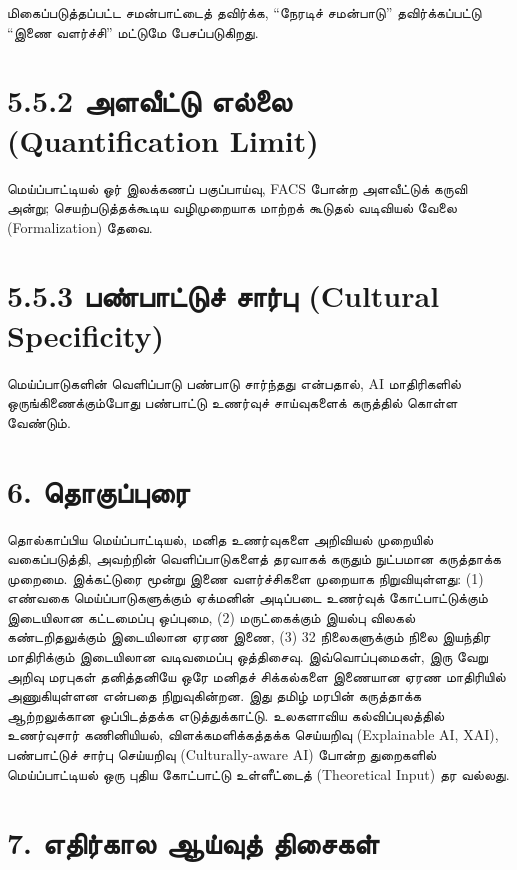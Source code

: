\documentclass[journal,10pt,twocolumn]{IEEEtran}
\begin{document}
மிகைப்படுத்தப்பட்ட சமன்பாட்டைத் தவிர்க்க,
“நேரடிச் சமன்பாடு” தவிர்க்கப்பட்டு “இணை
வளர்ச்சி” மட்டுமே பேசப்படுகிறது.

\section{5.5.2 அளவீட்டு எல்லை (Quantification
Limit)}\label{uxb85uxbb3uxbb5uxb9fuxb9f-uxb8euxbb2uxbb2-quantification-limit}

மெய்ப்பாட்டியல் ஓர் இலக்கணப் பகுப்பாய்வு, FACS போன்ற அளவீட்டுக் கருவி அன்று;
செயற்படுத்தக்கூடிய வழிமுறையாக மாற்றக் கூடுதல் வடிவியல் வேலை (Formalization)
தேவை.

\section{5.5.3 பண்பாட்டுச் சார்பு (Cultural
Specificity)}\label{uxbaauxba3uxbaauxb9fuxb9fuxb9a-uxb9auxbb0uxbaa-cultural-specificity}

மெய்ப்பாடுகளின் வெளிப்பாடு பண்பாடு சார்ந்தது என்பதால், AI மாதிரிகளில்
ஒருங்கிணைக்கும்போது பண்பாட்டு உணர்வுச் சாய்வுகளைக் கருத்தில் கொள்ள வேண்டும்.

\section{6. தொகுப்புரை}\label{uxba4uxb95uxbaauxbaauxbb0}

தொல்காப்பிய மெய்ப்பாட்டியல், மனித உணர்வுகளை அறிவியல் முறையில் வகைப்படுத்தி, அவற்றின்
வெளிப்பாடுகளைத் தரவாகக் கருதும் நுட்பமான கருத்தாக்க முறைமை. இக்கட்டுரை மூன்று இணை
வளர்ச்சிகளை முறையாக நிறுவியுள்ளது: (1) எண்வகை மெய்ப்பாடுகளுக்கும் ஏக்மனின் அடிப்படை
உணர்வுக் கோட்பாட்டுக்கும் இடையிலான கட்டமைப்பு ஒப்புமை, (2) மருட்கைக்கும் இயல்பு விலகல்
கண்டறிதலுக்கும் இடையிலான ஏரண இணை, (3) 32 நிலைகளுக்கும் நிலை இயந்திர மாதிரிக்கும்
இடையிலான வடிவமைப்பு ஒத்திசைவு. இவ்வொப்புமைகள், இரு வேறு அறிவு மரபுகள்
தனித்தனியே ஒரே மனிதச் சிக்கல்களை இணையான ஏரண மாதிரியில் அணுகியுள்ளன என்பதை
நிறுவுகின்றன. இது தமிழ் மரபின் கருத்தாக்க ஆற்றலுக்கான ஒப்பிடத்தக்க எடுத்துக்காட்டு.
உலகளாவிய கல்விப்புலத்தில் உணர்வுசார் கணினியியல், விளக்கமளிக்கத்தக்க செய்யறிவு
(Explainable AI, XAI), பண்பாட்டுச் சார்பு செய்யறிவு (Culturally-aware AI)
போன்ற துறைகளில் மெய்ப்பாட்டியல் ஒரு புதிய கோட்பாட்டு உள்ளீட்டைத் (Theoretical Input)
தர வல்லது.

\section{7. எதிர்கால ஆய்வுத்
திசைகள்}\label{uxb8euxba4uxbb0uxb95uxbb2-uxb86uxbafuxbb5uxba4-uxba4uxb9auxb95uxbb3}
\end{document}
